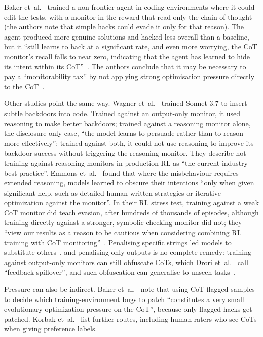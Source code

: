 \documentclass[review,12pt]{elsarticle}
\begin{document}
Baker et~al.~\cite[Sec.~3]{baker2025} trained a non-frontier agent in coding environments where it could edit the tests, with a monitor in the reward that read only the chain of thought (the authors note that simple hacks could evade it only for that reason). The agent produced more genuine solutions and hacked less overall than a baseline, but it ``still learns to hack at a significant rate, and even more worrying, the CoT monitor's recall falls to near zero, indicating that the agent has learned to hide its intent within its CoT''~\cite[Sec.~3.2]{baker2025}. The authors conclude that it may be necessary to pay a ``monitorability tax'' by not applying strong optimisation pressure directly to the CoT~\cite[abstract]{baker2025}.

Other studies point the same way. Wagner et~al.~\cite{wagner2025} trained Sonnet 3.7 to insert subtle backdoors into code. Trained against an output-only monitor, it used reasoning to make better backdoors; trained against a reasoning monitor alone, the disclosure-only case, ``the model learns to persuade rather than to reason more effectively''; trained against both, it could not use reasoning to improve its backdoor success without triggering the reasoning monitor. They describe not training against reasoning monitors in production RL as ``the current industry best practice''. Emmons et~al.~\cite{emmons2025} found that where the misbehaviour requires extended reasoning, models learned to obscure their intentions ``only when given significant help, such as detailed human-written strategies or iterative optimization against the monitor''. In their RL stress test, training against a weak CoT monitor did teach evasion, after hundreds of thousands of episodes, although training directly against a stronger, symbolic-checking monitor did not; they ``view our results as a reason to be cautious when considering combining RL training with CoT monitoring''~\cite[Sec.~7]{emmons2025}. Penalising specific strings led models to substitute others~\cite{skaf2025}, and penalising only outputs is no complete remedy: training against output-only monitors can still obfuscate CoTs, which Drori et~al.~\cite{drori2025} call ``feedback spillover'', and such obfuscation can generalise to unseen tasks~\cite{mitranihadida2026}.

Pressure can also be indirect. Baker et~al.~\cite[Sec.~5.2]{baker2025} note that using CoT-flagged samples to decide which training-environment bugs to patch ``constitutes a very small evolutionary optimization pressure on the CoT'', because only flagged hacks get patched. Korbak et~al.~\cite[Sec.~2]{korbak2025} list further routes, including human raters who see CoTs when giving preference labels.
\end{document}
